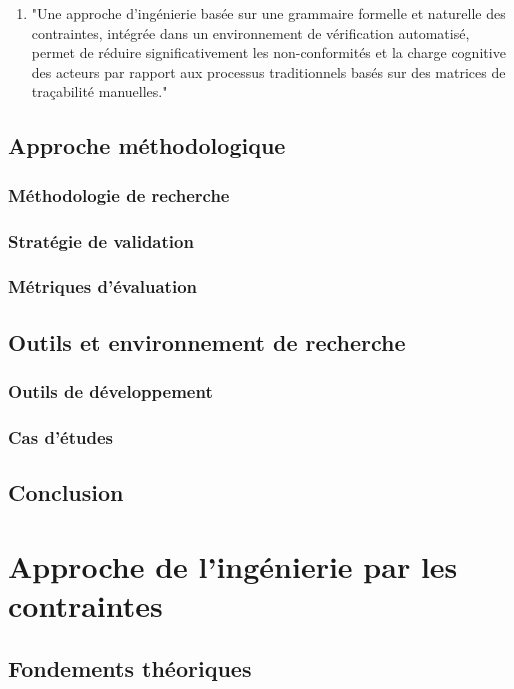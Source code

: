 \documentclass[a4paper,12pt]{article}
\begin{document}
\begin{enumerate}
\item "Une approche d'ingénierie basée sur une grammaire formelle et naturelle des contraintes, intégrée dans un environnement de vérification automatisé, permet de réduire significativement les non-conformités et la charge cognitive des acteurs par rapport aux processus traditionnels basés sur des matrices de traçabilité manuelles."
\end{enumerate}
\subsection{Approche méthodologique}
\label{sec:orge6d5306}
\subsubsection{Méthodologie de recherche}
\label{sec:orgc4d9337}
\subsubsection{Stratégie de validation}
\label{sec:orgf73041c}
\subsubsection{Métriques d'évaluation}
\label{sec:orgdeec3df}
\subsection{Outils et environnement de recherche}
\label{sec:org97291d3}
\subsubsection{Outils de développement}
\label{sec:orgc03820a}
\subsubsection{Cas d'études}
\label{sec:orga2c0d3a}
\subsection{Conclusion}
\label{sec:org8358ec4}
\clearpage
\section{Approche de l'ingénierie par les contraintes}
\label{sec:org9a41f4b}
\subsection{Fondements théoriques}
\label{sec:org6f7fe79}
\end{document}
